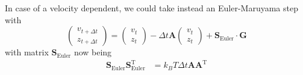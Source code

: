 \documentclass{article}
\numberwithin{equation}{section} %
\renewcommand{\rm}[1]{\mathrm{#1}}%
\newcommand{\T}{\rm{T}}
\newcommand{\1}{\mathds{1}} %
\begin{document}
In case of a velocity dependent, we could take instead an Euler-Maruyama step with
\begin{equation}
    \label{eq:propagator_Ostep_Euler_Maruyama}
   \begin{pmatrix} v_{t+\Delta t} \\ z_{t+\Delta t}  \end{pmatrix} = \begin{pmatrix} v_{t} \\ z_{t}  \end{pmatrix}  - \Delta t \bm{A} \begin{pmatrix} v_{t} \\ z_{t}  \end{pmatrix} + \bm{S}_\text{Euler}  \cdot \bm{G} 
\end{equation}
with matrix $\bm{S}_\text{Euler}$ now being 
\begin{align}
    \label{eq:FDT_OStep_Euler_Maruyama}
    \bm{S}_\text{Euler}\bm{S}_\text{Euler}^\T &= k_B T \Delta t \bm{A} \bm{A}^\T 
\end{align}
\end{document}

